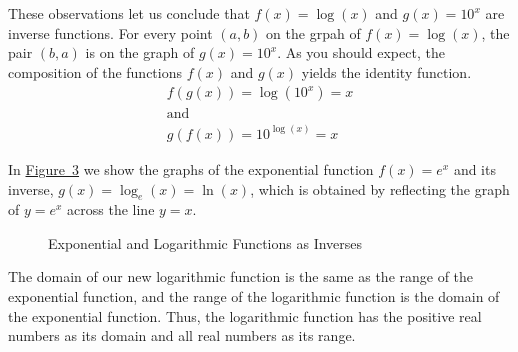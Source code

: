 \documentclass[10pt,]{book}
\theoremstyle{plain}
\theoremstyle{definition}
\theoremstyle{definition}
\theoremstyle{definition}
\numberwithin{equation}{section}
\begin{document}
\par
\hypertarget{p-326}{}%
These observations let us conclude that \(f(x) = \log \left( x \right)\) and \(g(x) = 10^x\) are inverse functions. For every point \(\left( a, b \right)\) on the grpah of \(f(x) = \log \left( x\right)\), the pair \(\left( b, a \right)\) is on the graph of \(g(x) = 10^x\). As you should expect, the composition of the functions \(f(x)\) and \(g(x)\) yields the identity function.%
\begin{gather*}
f \left( g(x) \right) = \log \left( 10^x \right) = x\\
\text{and}\\
g \left( f(x) \right) = 10^{\log(x)} = x
\end{gather*}
%
\par
\hypertarget{p-327}{}%
In \hyperref[exponential-log-inverses]{Figure~3} we show the graphs of the exponential function \(f(x) = e^x\) and its inverse, \(g(x) = \log_{e} \left( x \right) = \ln \left( x \right)\), which is obtained by reflecting the graph of \(y = e^x\) across the line \(y = x\).%
\begin{figure}
\centering
{
}
\caption{Exponential and Logarithmic Functions as Inverses\label{exponential-log-inverses}}
\end{figure}
\hypertarget{p-328}{}%
The domain of our new logarithmic function is the same as the range of the exponential function, and the range of the logarithmic function is the domain of the exponential function. Thus, the logarithmic function has the positive real numbers as its domain and all real numbers as its range.%
\end{document}
